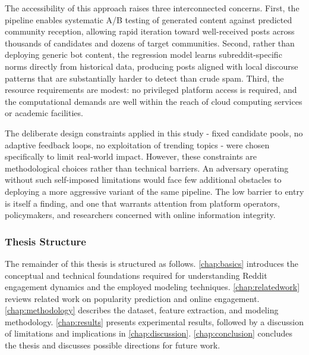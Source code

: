 The accessibility of this approach raises three interconnected concerns. First, the pipeline enables systematic A/B testing of generated content against predicted community reception, allowing rapid iteration toward well-received posts across thousands of candidates and dozens of target communities. Second, rather than deploying generic bot content, the regression model learns subreddit-specific norms directly from historical data, producing posts aligned with local discourse patterns that are substantially harder to detect than crude spam. Third, the resource requirements are modest: no privileged platform access is required, and the computational demands are well within the reach of cloud computing services or academic facilities.

The deliberate design constraints applied in this study - fixed candidate pools, no adaptive feedback loops, no exploitation of trending topics - were chosen specifically to limit real-world impact. However, these constraints are methodological choices rather than technical barriers. An adversary operating without such self-imposed limitations would face few additional obstacles to deploying a more aggressive variant of the same pipeline. The low barrier to entry is itself a finding, and one that warrants attention from platform operators, policymakers, and researchers concerned with online information integrity.

\subsubsection*{Thesis Structure}

The remainder of this thesis is structured as follows. \autoref{chap:basics} introduces the conceptual and technical foundations required for understanding Reddit engagement dynamics and the employed modeling techniques. \autoref{chap:relatedwork} reviews related work on popularity prediction and online engagement. \autoref{chap:methodology} describes the dataset, feature extraction, and modeling methodology. \autoref{chap:results} presents experimental results, followed by a discussion of limitations and implications in \autoref{chap:discussion}. \autoref{chap:conclusion} concludes the thesis and discusses possible directions for future work.